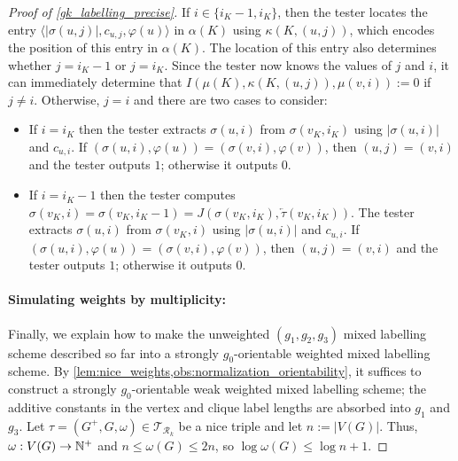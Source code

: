 \documentclass{patmorin}
\renewcommand{\le}{\leqslant}
\newcommand{\calR}{\mathcal{R}}
\newcommand{\calT}{\mathcal{T}}
\begin{document}
\begin{proof}[Proof of \cref{gk_labelling_precise}]
  If $i\in\{i_K-1,i_K\}$, then the tester locates the entry $\langle |\sigma(u,j)|, c_{u,j}, \varphi(u)\rangle$ in $\alpha(K)$ using $\kappa(K,(u,j))$, which encodes the position of this entry in $\alpha(K)$. The location of this entry also determines whether $j=i_K-1$ or $j=i_K$.  Since the tester now knows the values of $j$ and $i$, it can immediately determine that $I(\mu(K),\kappa(K,(u,j)),\mu(v,i)):=0$ if $j\neq i$.  Otherwise, $j=i$ and there are two cases to consider:
  \begin{itemize}
    \item If $i=i_K$ then the tester extracts $\sigma(u,i)$ from $\sigma(v_K,i_K)$ using $|\sigma(u,i)|$ and $c_{u,i}$.  If $(\sigma(u,i), \varphi(u)) = (\sigma(v,i), \varphi(v))$, then $(u,j)=(v,i)$ and the tester outputs $1$; otherwise it outputs $0$.
    \item If $i=i_K-1$ then the tester computes $\sigma(v_K,i)=\sigma(v_K,i_K-1)=J(\sigma(v_K,i_K),\overleftarrow{\tau}(v_K,i_K))$.  The tester extracts $\sigma(u,i)$ from $\sigma(v_K,i)$ using $|\sigma(u,i)|$ and $c_{u,i}$.  If $(\sigma(u,i), \varphi(u)) = (\sigma(v,i), \varphi(v))$, then $(u,j)=(v,i)$ and the tester outputs $1$; otherwise it outputs $0$.
  \end{itemize}


  \paragraph{Simulating weights by multiplicity:} Finally, we explain how to make the unweighted $(g_1,g_2,g_3)$ mixed labelling scheme described so far into a strongly $g_0$-orientable weighted mixed labelling scheme. By \cref{lem:nice_weights,obs:normalization_orientability}, it suffices to construct a strongly $g_0$-orientable weak weighted mixed labelling scheme; the additive constants in the vertex and clique label lengths are absorbed into $g_1$ and $g_3$. Let $\tau=(G^+,G,\omega)\in\calT_{\calR_k}$ be a nice triple and let $n:=|V(G)|$. Thus, $\omega:V(G)\to\mathbb{N}^+$ and $n\le\omega(G)\le 2n$, so $\log\omega(G)\le\log n+1$.


\end{proof}
\end{document}
